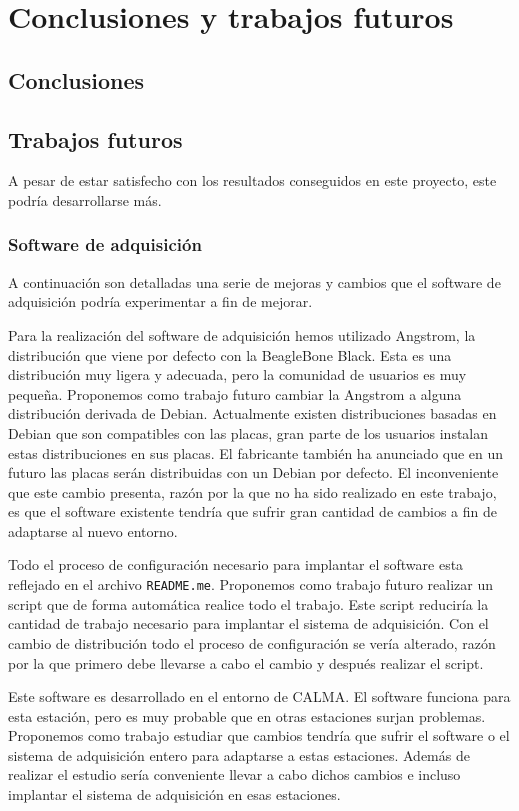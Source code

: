 \chapter{Conclusiones y trabajos futuros}
\label{cap_conclusiones}


\section{Conclusiones}

\section{Trabajos futuros}
	A pesar de estar satisfecho con los resultados conseguidos en este proyecto, este podría desarrollarse más.
	\subsection{Software de adquisición}
		A continuación son detalladas una serie de mejoras y cambios que el software de adquisición podría experimentar a fin de mejorar.
		\begin{description}[style=unboxed,leftmargin=0cm,labelwidth=1cm]
			\item[Debian]
				Para la realización del software de adquisición hemos utilizado Angstrom, la distribución que viene por defecto con la
				BeagleBone Black. Esta es una distribución muy ligera y adecuada, pero la comunidad de usuarios es muy pequeña.
				Proponemos como trabajo futuro cambiar la Angstrom a alguna distribución derivada de Debian. Actualmente existen
				distribuciones basadas en Debian que son compatibles con las placas, gran parte de los usuarios instalan estas
				distribuciones en sus placas. El fabricante también ha anunciado que en un futuro las placas serán distribuidas con un
				Debian por defecto. El inconveniente que este cambio presenta, razón por la que no ha sido realizado en este trabajo,
				es que el software existente tendría que sufrir gran cantidad de cambios a fin de adaptarse al nuevo entorno.
			\item[Script de configuración]
				Todo el proceso de configuración necesario para implantar el software esta reflejado en el archivo \texttt{README.me}.
				Proponemos como trabajo futuro realizar un script que de forma automática realice todo el trabajo. Este script
				reduciría la cantidad de trabajo necesario para implantar el sistema de adquisición. Con el cambio de distribución
				todo el proceso de configuración se vería alterado, razón por la que primero debe llevarse a cabo el cambio y después
				realizar el script.
			\item[Adaptación para otras estaciones]
				Este software es desarrollado en el entorno de CALMA. El software funciona para esta estación, pero es muy probable
				que en otras estaciones surjan problemas. Proponemos como trabajo estudiar que cambios tendría que sufrir el software
				o el sistema de adquisición entero para adaptarse a estas estaciones. Además de realizar el estudio sería conveniente
				llevar a cabo dichos cambios e incluso implantar el sistema de adquisición en esas estaciones.   
		\end{description}
